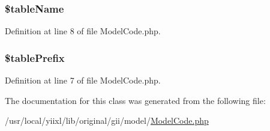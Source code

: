 \hypertarget{classModelCode_aea06aaf672e3fe5fbf45958ae2782244}{
\subsubsection[{\$tableName}]{\setlength{\rightskip}{0pt plus 5cm}\$tableName}}
\label{classModelCode_aea06aaf672e3fe5fbf45958ae2782244}


Definition at line 8 of file ModelCode.php.

\hypertarget{classModelCode_a061ded67e1c12c266312830d080f46a7}{
\subsubsection[{\$tablePrefix}]{\setlength{\rightskip}{0pt plus 5cm}\$tablePrefix}}
\label{classModelCode_a061ded67e1c12c266312830d080f46a7}


Definition at line 7 of file ModelCode.php.



The documentation for this class was generated from the following file:\begin{DoxyCompactItemize}
\item 
/usr/local/yiixl/lib/original/gii/model/\hyperlink{ModelCode_8php}{ModelCode.php}\end{DoxyCompactItemize}
